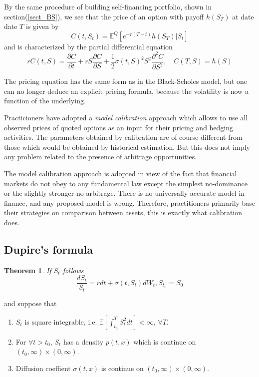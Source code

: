 \documentclass[10pt]{article}
\theoremstyle{plain}
\newtheorem{theorem}{Theorem}[section]
\numberwithin{equation}{section}
\numberwithin{table}{section}
\newcommand{\s}{\sigma}
\newcommand{\pa}{\partial}
\newcommand{\E}{\mathbb{E}}
\begin{document}
By the same procedure of building self-financing portfolio, shown in section(\ref{sect_BS}), we see that the price of an option with payoff $h(S_T)$ at date date $T$ is given by 
\[
    C(t,S_t) = \E^Q [ e^{-r(T-t)}h(S_T) \vert S_t  ]    
\]
and is characterized by the partial differential equation
\[
    rC(t,S) = \frac{\pa C}{\pa t} +rS\frac{\pa C}{\pa S} + \frac{1}{2} \s(t,S)^2 S^2 \frac{\pa^2 C}{\pa S^2}, \quad C(T,S)=h(S)    
\]

The pricing equation has the same form
as in the Black-Scholes model, but one can no longer deduce an explicit pricing
formula, because the volatility is now a function of the underlying.


Practicioners have adopted a \emph{model calibration} approach which allows
to use all observed prices of quoted options as an input for their pricing and
hedging activities. The parameters
obtained by calibration are of course different from those which would be
obtained by historical estimation. But this does not imply any problem related
to the presence of arbitrage opportunities.


The model calibration approach is adopted in view of the fact that financial
markets do not obey to any fundamental law except the simplest no-dominance
or the slightly stronger no-arbitrage. There is no universally
accurate model in finance, and any proposed model is wrong. Therefore,
practitioners primarily base their strategies on comparison between assets, this
is exactly what calibration does.

\subsection{Dupire's formula}

\begin{theorem}
If $S_t$ follows
\[
    \frac{dS_t}{S_t} = rdt + \s(t, S_t)dW_t, S_{t_0} = S_0      
\]
\end{theorem}
and suppose that
\begin{enumerate}
    \item $S_t$ is square integrable, i.e. $\E [ \int_{t_0}^T S_t^2 dt ] < \infty$, $\forall T$.
    \item For $\forall t > t_0$, $S_t$ has a density $p(t, x)$ which is continue on $(t_0, \infty) \times (0, \infty)$.
    \item Diffusion coeffient $\s(t, x)$ is continue on $(t_0, \infty) \times (0, \infty)$.
\end{enumerate}
\end{document}
